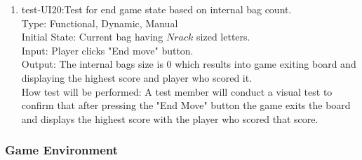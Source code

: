 \documentclass[12pt, titlepage]{article}
\begin{document}
\begin{enumerate}
    \item{test-UI20:Test for end game state based on internal bag count.\\} %
    Type: Functional, Dynamic, Manual\\
    Initial State: Current bag having $N rack$ sized letters.\\
    Input: Player clicks "End move" button. \\
    Output: The internal bags size is 0 which results into game exiting board and displaying the highest score and player who scored it. \\
    How test will be performed: A test member will conduct a visual test to confirm that after pressing the "End Move" button the game exits the board and displays the highest score with the player who scored that score.\\
    
\end{enumerate}
\subsubsection{Game Environment}
\end{document}
